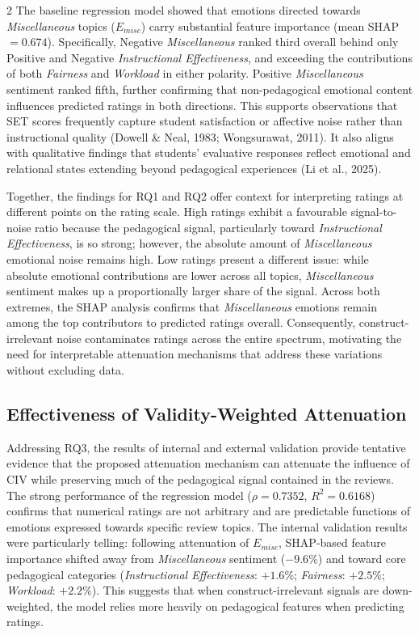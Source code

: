 \documentclass{article}
\begin{document}
\begin{multicols*}{2}
The baseline regression model showed that emotions directed towards \textit{Miscellaneous} topics ($E_{misc}$) carry substantial feature importance (mean SHAP $= 0.674$). Specifically, Negative \textit{Miscellaneous} ranked third overall behind only Positive and Negative \textit{Instructional Effectiveness}, and exceeding the contributions of both \textit{Fairness} and \textit{Workload} in either polarity. Positive \textit{Miscellaneous} sentiment ranked fifth, further confirming that non-pedagogical emotional content influences predicted ratings in both directions. This supports observations that SET scores frequently capture student satisfaction or affective noise rather than instructional quality (Dowell \& Neal, 1983; Wongsurawat, 2011). It also aligns with qualitative findings that students' evaluative responses reflect emotional and relational states extending beyond pedagogical experiences (Li et al., 2025).

Together, the findings for RQ1 and RQ2 offer context for interpreting ratings at different points on the rating scale. High ratings exhibit a favourable signal-to-noise ratio because the pedagogical signal, particularly toward \textit{Instructional Effectiveness}, is so strong; however, the absolute amount of \textit{Miscellaneous} emotional noise remains high. Low ratings present a different issue: while absolute emotional contributions are lower across all topics, \textit{Miscellaneous} sentiment makes up a proportionally larger share of the signal. Across both extremes, the SHAP analysis confirms that \textit{Miscellaneous} emotions remain among the top contributors to predicted ratings overall. Consequently, construct-irrelevant noise contaminates ratings across the entire spectrum, motivating the need for interpretable attenuation mechanisms that address these variations without excluding data.

\subsection{Effectiveness of Validity-Weighted Attenuation}

Addressing RQ3, the results of internal and external validation provide tentative evidence that the proposed attenuation mechanism can attenuate the influence of CIV while preserving much of the pedagogical signal contained in the reviews. The strong performance of the regression model ($\rho = 0.7352$, $R^2 = 0.6168$) confirms that numerical ratings are not arbitrary and are predictable functions of emotions expressed towards specific review topics. The internal validation results were particularly telling: following attenuation of $E_{misc}$, SHAP-based feature importance shifted away from \textit{Miscellaneous} sentiment ($-9.6\%$) and toward core pedagogical categories (\textit{Instructional Effectiveness}: $+1.6\%$; \textit{Fairness}: $+2.5\%$; \textit{Workload}: $+2.2\%$). This suggests that when construct-irrelevant signals are down-weighted, the model relies more heavily on pedagogical features when predicting ratings.


\end{multicols*}
\end{document}
